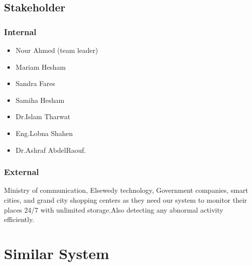 \documentclass[12pt]{article}
\begin{document}
\subsection{Stakeholder}
\subsubsection{Internal}

\begin{itemize}
\item Nour Ahmed (team leader)
\item Mariam Hesham
\item Sandra Fares
\item Samiha Hesham
\item Dr.Islam Tharwat
\item Eng.Lobna Shahen
\item Dr.Ashraf AbdelRaouf.
\end{itemize}


\subsubsection{External}
Ministry of communication, Elsewedy technology, Government companies, smart cities, and grand city shopping centers as they need our system to monitor their places 24/7 with unlimited storage.Also detecting any abnormal activity efficiently.

\section{Similar System}
\end{document}
